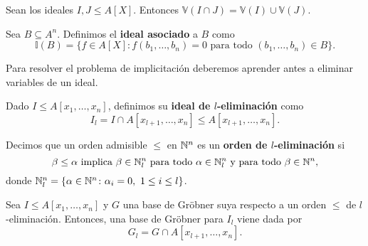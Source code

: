 \begin{proposicion}
    Sean los ideales $I,J\le A[X]$. Entonces  $\mathbb{V}(I \cap J) = \mathbb{V}(I) \cup \mathbb{V}(J)$.
\end{proposicion}
\begin{definicion}
    Sea $B\subseteq A^n$. Definimos el \textbf{ideal asociado} a $B$ como
    \begin{equation*}
        \mathbb{I}(B) = \{f\in A[X] : f(b_1,\dots, b_n) = 0 \text{ para todo } (b_1,\dots, b_n)\in B\}.
    \end{equation*}
\end{definicion}

Para resolver el problema de implicitación deberemos aprender antes a eliminar variables de un ideal.
\begin{definicion}
    Dado $I\le A[x_1,\dots,x_n]$, definimos su \textbf{ideal de $l$-eliminación} como
    \begin{equation*}
        I_l = I \cap A[x_{l+1}, \dots, x_n] \le A[x_{l+1}, \dots, x_n].
    \end{equation*}
\end{definicion}

\begin{definicion}
    Decimos que un orden admisible $\le$ en $\mathbb{N}^n$ es un \textbf{orden de $l$-eliminación} si 
    $$\beta\le \alpha \text{ implica } \beta \in \mathbb{N}_l^n \text{ para todo } \alpha \in \mathbb{N}_l^n \text{ y } \text{para todo } \beta \in \mathbb{N}^n,$$
    donde $\mathbb{N}_l^n = \{\alpha\in \mathbb{N}^n \colon \alpha_i =0,\ 1\le i \le l\}$.
\end{definicion}

\begin{teorema}[Eliminación]
    Sea $I\le A[x_1,\dots,x_n]$ y $G$ una base de Gröbner suya respecto a un orden $\le$ de $l$-eliminación. Entonces, una base de Gröbner para $I_l$ viene dada por
    \begin{equation*}
        G_l = G\cap A[x_{l+1},\dots, x_n].
    \end{equation*}
\end{teorema}


